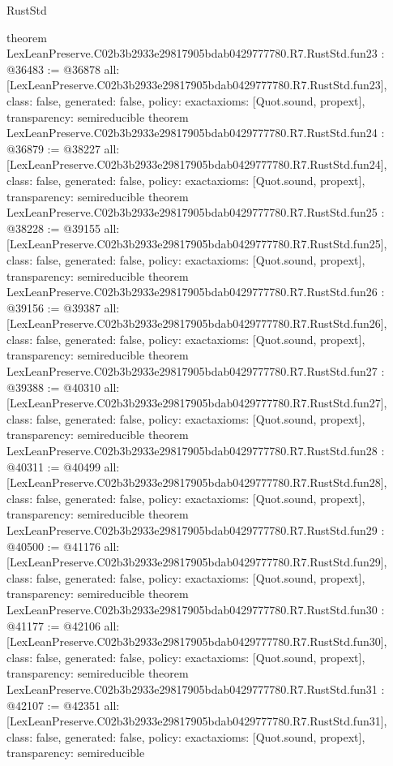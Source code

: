\begin{lexlean}{RustStd}
\begin{coremodule}
{}
theorem LexLeanPreserve.C02b3b2933e29817905bdab0429777780.R7.RustStd.fun23 : @36483 := @36878 {
  all: [LexLeanPreserve.C02b3b2933e29817905bdab0429777780.R7.RustStd.fun23],
  class: false,
  generated: false,
  policy: exact{axioms: [Quot.sound, propext]},
  transparency: semireducible
}
theorem LexLeanPreserve.C02b3b2933e29817905bdab0429777780.R7.RustStd.fun24 : @36879 := @38227 {
  all: [LexLeanPreserve.C02b3b2933e29817905bdab0429777780.R7.RustStd.fun24],
  class: false,
  generated: false,
  policy: exact{axioms: [Quot.sound, propext]},
  transparency: semireducible
}
theorem LexLeanPreserve.C02b3b2933e29817905bdab0429777780.R7.RustStd.fun25 : @38228 := @39155 {
  all: [LexLeanPreserve.C02b3b2933e29817905bdab0429777780.R7.RustStd.fun25],
  class: false,
  generated: false,
  policy: exact{axioms: [Quot.sound, propext]},
  transparency: semireducible
}
theorem LexLeanPreserve.C02b3b2933e29817905bdab0429777780.R7.RustStd.fun26 : @39156 := @39387 {
  all: [LexLeanPreserve.C02b3b2933e29817905bdab0429777780.R7.RustStd.fun26],
  class: false,
  generated: false,
  policy: exact{axioms: [Quot.sound, propext]},
  transparency: semireducible
}
theorem LexLeanPreserve.C02b3b2933e29817905bdab0429777780.R7.RustStd.fun27 : @39388 := @40310 {
  all: [LexLeanPreserve.C02b3b2933e29817905bdab0429777780.R7.RustStd.fun27],
  class: false,
  generated: false,
  policy: exact{axioms: [Quot.sound, propext]},
  transparency: semireducible
}
theorem LexLeanPreserve.C02b3b2933e29817905bdab0429777780.R7.RustStd.fun28 : @40311 := @40499 {
  all: [LexLeanPreserve.C02b3b2933e29817905bdab0429777780.R7.RustStd.fun28],
  class: false,
  generated: false,
  policy: exact{axioms: [Quot.sound, propext]},
  transparency: semireducible
}
theorem LexLeanPreserve.C02b3b2933e29817905bdab0429777780.R7.RustStd.fun29 : @40500 := @41176 {
  all: [LexLeanPreserve.C02b3b2933e29817905bdab0429777780.R7.RustStd.fun29],
  class: false,
  generated: false,
  policy: exact{axioms: [Quot.sound, propext]},
  transparency: semireducible
}
theorem LexLeanPreserve.C02b3b2933e29817905bdab0429777780.R7.RustStd.fun30 : @41177 := @42106 {
  all: [LexLeanPreserve.C02b3b2933e29817905bdab0429777780.R7.RustStd.fun30],
  class: false,
  generated: false,
  policy: exact{axioms: [Quot.sound, propext]},
  transparency: semireducible
}
theorem LexLeanPreserve.C02b3b2933e29817905bdab0429777780.R7.RustStd.fun31 : @42107 := @42351 {
  all: [LexLeanPreserve.C02b3b2933e29817905bdab0429777780.R7.RustStd.fun31],
  class: false,
  generated: false,
  policy: exact{axioms: [Quot.sound, propext]},
  transparency: semireducible
}
\end{coremodule}
\end{lexlean}

